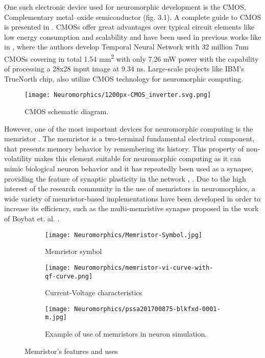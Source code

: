 \documentclass[12pt]{report}
\begin{document}
One such electronic device used for neuromorphic development is the CMOS, Complementary metal–oxide semiconductor (fig. 3.1). A complete guide to CMOS is presented in \cite{Baker2005}. CMOSs offer great advantages over typical circuit elements like low energy consumption and scalability and have been used in previous works like in \cite{Nair2020}, where the authors develop Temporal Neural Network with 32 million 7nm CMOSs covering in total 1.54 mm\textsuperscript{2} with only 7.26 mW power with the capability of processing a 28x28 input image at 9.34 ns. Large-scale projects like IBM's TrueNorth chip, also utilize CMOS technology for neuromorphic computing.

\begin{figure}[htp]
    \centering
    \texttt{[image: Neuromorphics/1200px-CMOS\_inverter.svg.png]}
    \caption{CMOS schematic diagram.}
    \label{fig:truenorth}
\end{figure}

However, one of the most important devices for neuromorphic computing is the memristor \cite{Chua1971}. The memristor is a two-terminal fundamental electrical component, that presents memory behavior by remembering its history. This property of non-volatility makes this element suitable for neuromorphic computing as it can mimic biological neuron behavior and it has repeatedly been used as a synapse, providing the feature of synaptic plasticity in the network \cite{Wang2012}, \cite{Jo2010}. Due to the high interest of the research community in the use of memristors in neuromorphics, a wide variety of memristor-based implementations have been developed in order to increase its efficiency, such as the multi-memristive synapse proposed in the work of Boybat et. al. \cite{Boybat2018}.

\begin{figure}
\centering
\begin{subfigure}{.5\textwidth}
  \centering
  \texttt{[image: Neuromorphics/Memristor-Symbol.jpg]}
  \caption{Memristor symbol}
  \label{fig:sub1}
\end{subfigure}%
\begin{subfigure}{.7\textwidth}
  \centering
  \texttt{[image: Neuromorphics/memristor-vi-curve-with-qf-curve.png]}
  \caption{Current-Voltage characteristics}
  \label{fig:sub2}
\end{subfigure}
\begin{subfigure}{.8\textwidth}
  \centering
  \texttt{[image: Neuromorphics/pssa201700875-blkfxd-0001-m.jpg]}
  \caption{Example of use of memristors in neuron simulation.}
  \label{fig:sub2}
\end{subfigure}
\caption{Memristor's features and uses}
\label{fig:test}
\end{figure}
\end{document}
